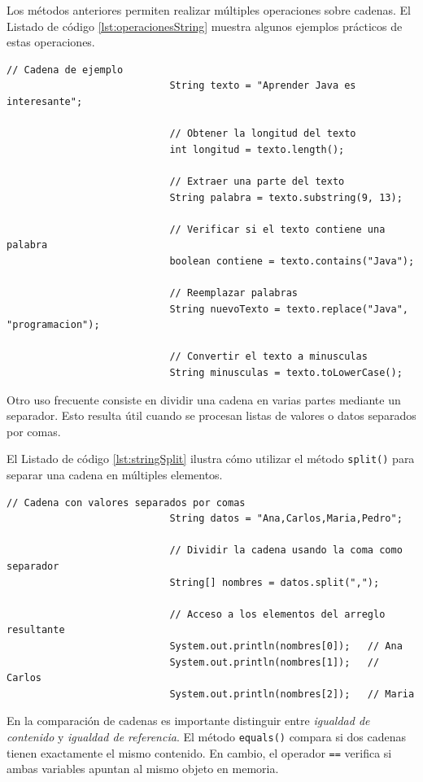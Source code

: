 \documentclass[12pt,twoside]{book}
\begin{document}
						\noindent
						Los métodos anteriores permiten realizar múltiples operaciones sobre cadenas. El Listado de código \ref{lst:operacionesString} muestra algunos ejemplos prácticos de estas operaciones.
						
						\begin{lstlisting}[style=Java,caption={Operaciones comunes con cadenas.},label={lst:operacionesString}]
							// Cadena de ejemplo
							String texto = "Aprender Java es interesante";
							
							// Obtener la longitud del texto
							int longitud = texto.length();
							
							// Extraer una parte del texto
							String palabra = texto.substring(9, 13);
							
							// Verificar si el texto contiene una palabra
							boolean contiene = texto.contains("Java");
							
							// Reemplazar palabras
							String nuevoTexto = texto.replace("Java", "programacion");
							
							// Convertir el texto a minusculas
							String minusculas = texto.toLowerCase();
						\end{lstlisting}
						
						\noindent
						Otro uso frecuente consiste en dividir una cadena en varias partes mediante un separador. Esto resulta útil cuando se procesan listas de valores o datos separados por comas.
						
						El Listado de código \ref{lst:stringSplit} ilustra cómo utilizar el método \texttt{split()} para separar una cadena en múltiples elementos.
						
						\begin{lstlisting}[style=Java,caption={División de cadenas con split.},label={lst:stringSplit}]
							// Cadena con valores separados por comas
							String datos = "Ana,Carlos,Maria,Pedro";
							
							// Dividir la cadena usando la coma como separador
							String[] nombres = datos.split(",");
							
							// Acceso a los elementos del arreglo resultante
							System.out.println(nombres[0]);   // Ana
							System.out.println(nombres[1]);   // Carlos
							System.out.println(nombres[2]);   // Maria
						\end{lstlisting}
						
						\noindent
						En la comparación de cadenas es importante distinguir entre \textit{igualdad de contenido} y \textit{igualdad de referencia}. El método \texttt{equals()} compara si dos cadenas tienen exactamente el mismo contenido. En cambio, el operador \texttt{==} verifica si ambas variables apuntan al mismo objeto en memoria.
						
\end{document}
